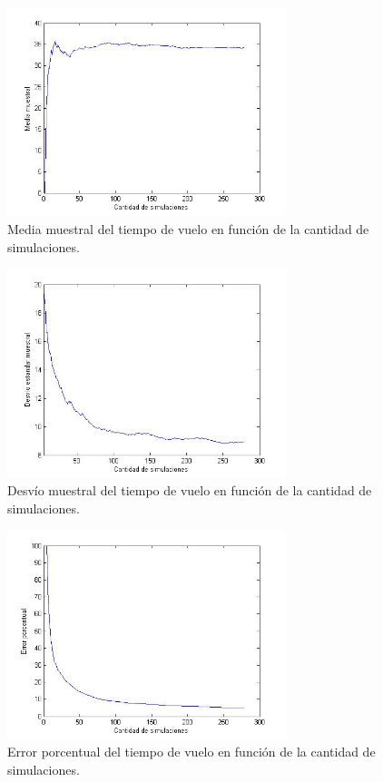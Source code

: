 \documentclass[10pt,journal,compsoc]{IEEEtran}
\begin{document}
\begin{figure}[t]
\label{fig:3d}
\begin{center}
\centering
\includegraphics[width=3.2in]{media_muestral.jpg}
\caption{Media muestral del tiempo de vuelo en funci\'on de la cantidad de simulaciones.}
\end{center}
\end{figure}


\begin{figure}[t]
\label{fig:3d}
\begin{center}
\centering
\includegraphics[width=3.2in]{desvio.jpg}
\caption{Desv\'io muestral del tiempo de vuelo en funci\'on de la cantidad de simulaciones.}
\end{center}
\end{figure}



\begin{figure}[t]
\label{fig:3d}
\begin{center}
\centering
\includegraphics[width=3.2in]{error_porcentual.jpg}
\caption{Error porcentual del tiempo de vuelo en funci\'on de la cantidad de simulaciones.}
\end{center}
\end{figure}
\end{document}
